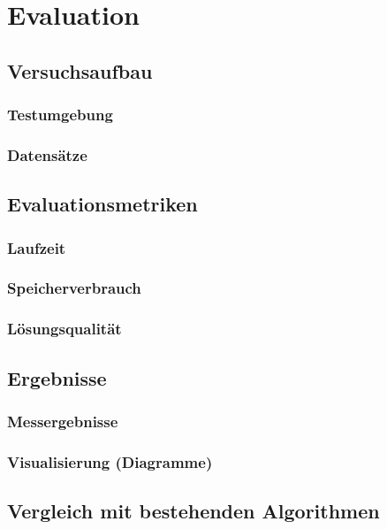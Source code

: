 \chapter{Evaluation} %
\label{chap:ergebnisse}

\section{Versuchsaufbau}

\subsection{Testumgebung}

\subsection{Datensätze}

\section{Evaluationsmetriken}

\subsection{Laufzeit}

\subsection{Speicherverbrauch}

\subsection{Lösungsqualität}

\section{Ergebnisse}

\subsection{Messergebnisse}

\subsection{Visualisierung (Diagramme)}

\section{Vergleich mit bestehenden Algorithmen}